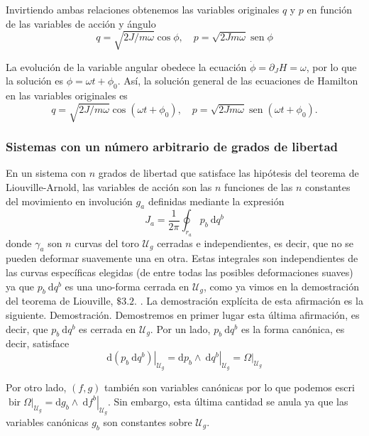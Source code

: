 Invirtiendo ambas relaciones obtenemos las variables originales $q$ y $p$ en función de las variables de acción y ángulo
$$
\begin{equation*}
q=\sqrt{2 J / m \omega} \cos \phi, \quad p=\sqrt{2 J m \omega} \operatorname{sen} \phi \tag{3.5}
\end{equation*}
$$

La evolución de la variable angular obedece la ecuación $\dot{\phi}=\partial_{J} H=\omega$, por lo que la solución es $\phi=\omega t+\phi_{0}$. Así, la solución general de las ecuaciones de Hamilton en las variables originales es
$$
q=\sqrt{2 J / m \omega} \cos \left(\omega t+\phi_{0}\right), \quad p=\sqrt{2 J m \omega} \operatorname{sen}\left(\omega t+\phi_{0}\right) .
$$
\subsubsection{Sistemas con un número arbitrario de grados de libertad}
En un sistema con $n$ grados de libertad que satisface las hipótesis del teorema de Liouville-Arnold, las variables de acción son las $n$ funciones de las $n$ constantes del movimiento en involución $g_{a}$ definidas mediante la expresión
$$
J_{a}=\frac{1}{2 \pi} \oint_{r_{a}} p_{b} \mathrm{~d} q^{b}
$$
donde $\gamma_{a}$ son $n$ curvas del toro $\mathscr{U}_{g}$ cerradas e independientes, es decir, que no se pueden deformar suavemente una en otra. Estas integrales son independientes de las curvas específicas elegidas (de entre todas las posibles deformaciones suaves) ya que $p_{b} \mathrm{~d} q^{b}$ es una uno-forma cerrada en $\mathscr{U}_{g}$, como ya vimos en la demostración del teorema de Liouville, $\$ 3.2$. . La demostración explícita de esta afirmación es la siguiente.
Demostración. Demostremos en primer lugar esta última afirmación, es decir, que $p_{b} \mathrm{~d} q^{b}$ es cerrada en $\mathscr{U}_{g}$. Por un lado, $p_{b} \mathrm{~d} q^{b}$ es la forma canónica, es decir, satisface
$$
\left.\mathrm{d}\left(p_{b} \mathrm{~d} q^{b}\right)\right|_{\mathscr{U}_{g}}=\left.\mathrm{d} p_{b} \wedge \mathrm{~d} q^{b}\right|_{\mathscr{U}_{g}}=\left.\Omega\right|_{\mathscr{U}_{g}}
$$

Por otro lado, $(f, g)$ también son variables canónicas por lo que podemos escri$\left.\operatorname{bir} \Omega\right|_{\mathscr{U}_{g}}=\left.\mathrm{d} g_{b} \wedge \mathrm{~d} f^{b}\right|_{\mathscr{U}_{g}}$. Sin embargo, esta última cantidad se anula ya que las variables canónicas $g_{b}$ son constantes sobre $\mathscr{U}_{g}$.

